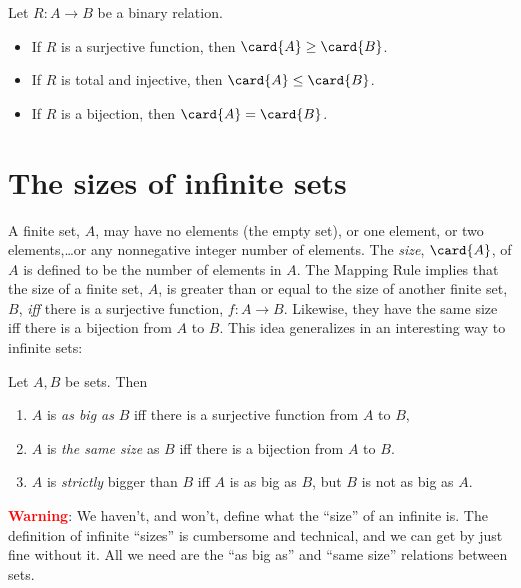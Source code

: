 \begin{lemma}\label{mapruldef}
 \mbox{}
Let $R: A \to B$ be a binary relation.

\begin{itemize}

\item If $R$ is a surjective function, then $\card{A} \geq \card{B}$.

\item If $R$ is total and injective, then $\card{A} \leq \card{B}$.

\item If $R$ is a bijection, then $\card{A} = \card{B}$.

\end{itemize}
\end{lemma}

\section{The sizes of infinite sets}

A finite set, $A$, may have no elements (the empty set), or one element,
or two elements,\dots or any nonnegative integer number of elements.  The
\emph{size}, $\card{A}$, of $A$ is defined to be the number of elements in
$A$.  The Mapping Rule implies that the size of a finite set, $A$, is
greater than or equal to the size of another finite set, $B$, \emph{iff}
there is a surjective function, $f:A \to B$.  Likewise, they have the same size iff
there is a bijection from $A$ to $B$.  This idea generalizes in an
interesting way to infinite sets:
\begin{definition}\label{bigger}
Let $A,B$ be sets.  Then
\begin{enumerate}
\item $A$ is \emph{as big as} $B$ iff there is a surjective
  function from $A$ to $B$,

\item $A$ is \emph{the same size} as $B$ iff there is a bijection from $A$
  to $B$.

\item $A$ is \emph{strictly} bigger than $B$ iff $A$ is as big as $B$,
  but $B$ is not as big as $A$.
\end{enumerate}
\end{definition}

\textcolor{red}{\textbf{Warning}}: We haven't, and won't, define what the
``size'' of an infinite is.  The definition of infinite ``sizes'' is
cumbersome and technical, and we can get by just fine without it.  All we
need are the ``as big as'' and ``same size'' relations between sets.

